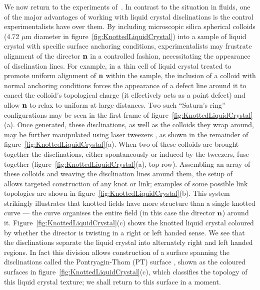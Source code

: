 We now return to the experiments of~\citep{Tkalec2011,Tasinkevych2014,Copar2015}. In contrast to the situation in fluids, one of the major advantages of working with liquid crystal disclinations is the control experimentalists have over them. By including microscopic silica spherical colloids (4.72 $\mu$m diameter in figure~\ref{fig:KnottedLiquidCrystal}) into a sample of liquid crystal with specific surface anchoring conditions, experimentalists may frustrate alignment of the director $\bf n$ in a controlled fashion, necessitating the appearance of disclination lines. For example, in a thin cell of liquid crystal treated to promote uniform alignment of $\bf n$ within the sample, the inclusion of a colloid with normal anchoring conditions forces the appearance of a defect line around it to cancel the colloid's topological charge (it effectively acts as a point defect) and allow $\bf n$ to relax to uniform at large distances. Two such ``Saturn's ring'' configurations may be seen in the first frame of figure~\ref{fig:KnottedLiquidCrystal}(a). Once generated, these disclinations, as well as the colloids they wrap around, may be further manipulated using laser tweezers \citep{Tkalec2011}, as shown in the remainder of figure~\ref{fig:KnottedLiquidCrystal}(a). When two of these colloids are brought together the disclinations, either spontaneously or induced by the tweezers, fuse together (figure~\ref{fig:KnottedLiquidCrystal}(a), top row). Assembling an array of these colloids and weaving the disclination lines around them, the setup of~\citep{Tkalec2011,Tasinkevych2014,Copar2015} allows targeted construction of any knot or link; examples of some possible link topologies are shown in figure~\ref{fig:KnottedLiquidCrystal}(b). This system strikingly illustrates that knotted fields have more structure than a single knotted curve --- the curve organises the entire field (in this case the director $\bf n$) around it. Figure~\ref{fig:KnottedLiquidCrystal}(c) shows the knotted liquid crystal coloured by whether the director is twisting in a right or left handed sense. We see that the disclinations separate the liquid crystal into alternately right and left handed regions. In fact this division allows construction of a surface spanning the disclinations called the Pontryagin-Thom (PT) surface \citep{ChenThesis,Chen2013}, shown as the coloured surfaces in figure~\ref{fig:KnottedLiquidCrystal}(c), which classifies the topology of this liquid crystal texture; we shall return to this surface in a moment.

